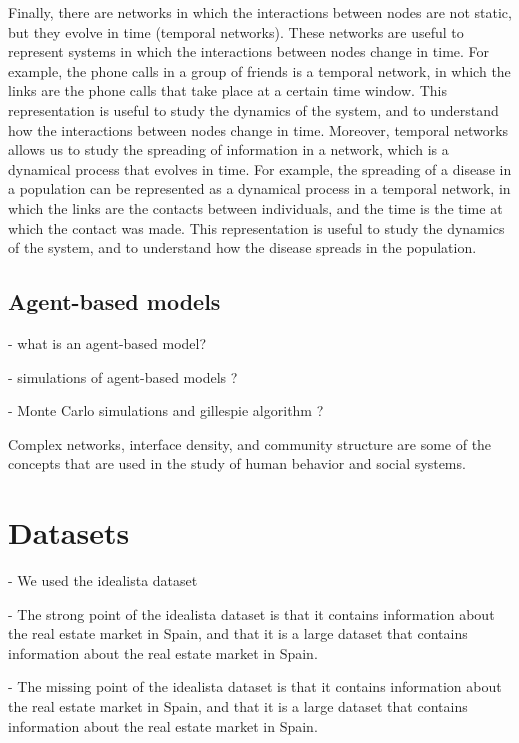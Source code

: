 Finally, there are networks in which the interactions between nodes are not static, but they evolve in time (temporal networks). These networks are useful to represent systems in which the interactions between nodes change in time. For example, the phone calls in a group of friends is a temporal network, in which the links are the phone calls that take place at a certain time window. This representation is useful to study the dynamics of the system, and to understand how the interactions between nodes change in time. Moreover, temporal networks allows us to study the spreading of information in a network, which is a dynamical process that evolves in time. For example, the spreading of a disease in a population can be represented as a dynamical process in a temporal network, in which the links are the contacts between individuals, and the time is the time at which the contact was made. This representation is useful to study the dynamics of the system, and to understand how the disease spreads in the population.

\subsection{\label{subsec:Agent-based models} Agent-based models}

- what is an agent-based model?

- simulations of agent-based models ?

- Monte Carlo simulations and gillespie algorithm ?



Complex networks, interface density, and community structure are some of the concepts that are used in the study of human behavior and social systems.



\section{\label{sec:Datasets} Datasets}

- We used the idealista dataset

- The strong point of the idealista dataset is that it contains information about the real estate market in Spain, and that it is a large dataset that contains information about the real estate market in Spain.

- The missing point of the idealista dataset is that it contains information about the real estate market in Spain, and that it is a large dataset that contains information about the real estate market in Spain.
